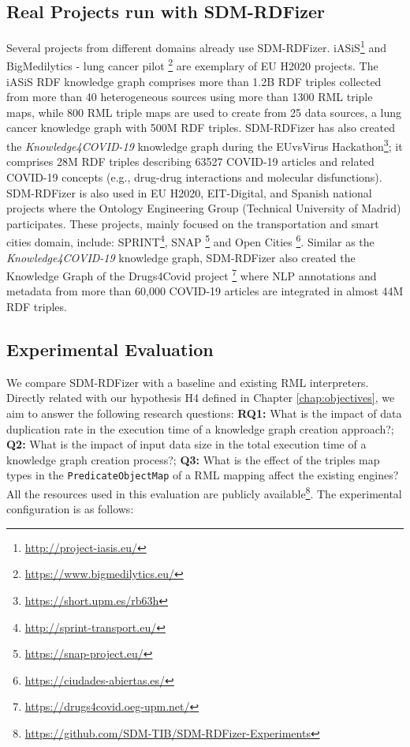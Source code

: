 \subsection{Real Projects run with SDM-RDFizer}


Several projects from different domains already use SDM-RDFizer.
iASiS\footnote{\url{http://project-iasis.eu/}} and BigMedilytics - lung cancer pilot \footnote{\url{https://www.bigmedilytics.eu/}} are exemplary of EU H2020 projects.
The iASiS RDF knowledge graph comprises more than 1.2B RDF triples collected from more than 40 heterogeneous sources using more than 1300 RML triple maps, while 800 RML triple maps are used to create from 25 data sources, a lung cancer knowledge graph with 500M RDF triples. SDM-RDFizer has also created the \textit{Knowledge4COVID-19} knowledge graph during the EUvsVirus Hackathon\footnote{\url{https://short.upm.es/rb63h}}; it comprises 28M RDF triples describing 63527 COVID-19 articles and related COVID-19 concepts (e.g., drug-drug interactions and molecular disfunctions). SDM-RDFizer is also used in EU H2020, EIT-Digital, and Spanish national projects where the Ontology Engineering Group (Technical University of Madrid) participates. These projects, mainly focused on the transportation and smart cities domain, include: SPRINT\footnote{\url{http://sprint-transport.eu/}}, SNAP \footnote{\url{https://snap-project.eu/}} and Open Cities \footnote{\url{https://ciudades-abiertas.es/}}. Similar as the \textit{Knowledge4COVID-19} knowledge graph, SDM-RDFizer also created the Knowledge Graph of the Drugs4Covid project \footnote{\url{https://drugs4covid.oeg-upm.net/}} where NLP annotations and metadata from more than 60,000 COVID-19 articles are integrated in almost 44M RDF triples.

\subsection{Experimental Evaluation}

We compare SDM-RDFizer with a baseline and existing RML interpreters. Directly related with our hypothesis H4 defined in Chapter \ref{chap:objectives},  we aim to answer the following research questions: \textbf{RQ1:} What is the impact of data duplication rate in the execution time of a knowledge graph creation approach?; \textbf{Q2:} What is the impact of input data size in the total execution time of a knowledge graph creation process?; \textbf{Q3:} What is the effect of the triples map types in the \verb|PredicateObjectMap| of a RML mapping affect the existing engines? All the resources used in this evaluation are publicly available\footnote{\url{https://github.com/SDM-TIB/SDM-RDFizer-Experiments}}. The experimental configuration is as follows:

